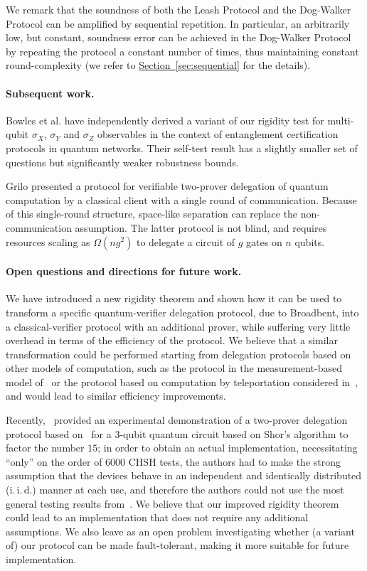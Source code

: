 \documentclass[11pt]{article}
\numberwithin{equation}{section}
\theoremstyle{definition}
\theoremstyle{plain}
\newcommand{\expref}[2]{\hyperref[#2]{#1~\ref{#2}}}
\begin{document}
We remark that the soundness of both the Leash Protocol and the Dog-Walker Protocol can be amplified by sequential repetition. In particular, an arbitrarily low, but constant, soundness error can be achieved in the Dog-Walker Protocol by repeating the protocol a constant number of times, thus maintaining constant round-complexity (we refer to \expref{Section}{sec:sequential} for the details).

\paragraph{Subsequent work.}
Bowles et al. \cite{BowlesSCA18}  have independently derived a
variant of our rigidity test for multi-qubit $\sigma_X$, $\sigma_Y$ and $\sigma_Z$ observables
in the context of entanglement certification protocols in
quantum networks.
Their self-test result has a slightly smaller set of questions but  significantly weaker robustness
bounds.

Grilo \cite{Grilo17} presented a protocol for verifiable
two-prover delegation of quantum computation by a classical client with a single round of communication. Because of this single-round structure, space-like separation can replace the non-communication assumption. The latter protocol is not blind, and requires resources scaling as $\Omega(ng^2)$ to delegate a circuit of $g$ gates on $n$ qubits.

\paragraph{Open questions and directions for future work.}
We have introduced a new rigidity theorem and shown how it can be used to transform a specific quantum-verifier delegation protocol, due to Broadbent, into a classical-verifier protocol with an additional prover, while suffering very little overhead in terms of the efficiency of the protocol. We believe that a similar transformation could be performed starting from delegation protocols based on other models of computation, such as the protocol in the measurement-based model of~\cite{fitzsimons12vubqc} or the protocol based on computation by teleportation considered in~\cite{reichardt2012classical}, and would lead to similar efficiency improvements. 

Recently,~\cite{experiment_ruv} provided an experimental demonstration of a
two-prover delegation protocol based on~\cite{reichardt2012classical} for a
$3$-qubit quantum circuit based on Shor's algorithm to factor the number $15$;
in order to obtain an actual implementation, necessitating ``only'' on the order
of $6000$ CHSH tests, the authors had to make the strong assumption that the
devices behave in an independent and identically distributed (i.\,i.\,d.)
manner at each use, and therefore the authors could not use the most
general testing results from~\cite{reichardt2012classical}. We believe that our
improved rigidity theorem could lead to an implementation that does not require
any additional assumptions. We also leave as an open problem investigating whether (a
variant of) our protocol can be made fault-tolerant, making it more suitable for
future implementation.
\end{document}
